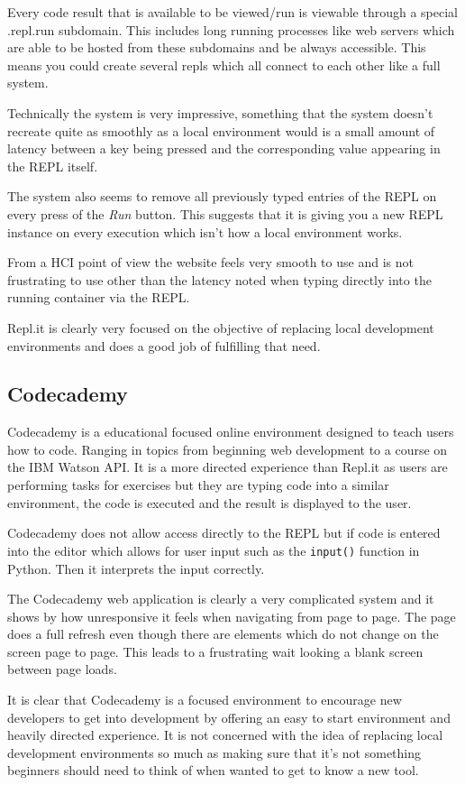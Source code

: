Every code result that is available to be viewed/run is viewable through a special .repl.run subdomain. This includes long running processes like web servers which are able to be hosted from these subdomains and be always accessible. This means you could create several repls which all connect to each other like a full system.

Technically the system is very impressive, something that the system doesn't recreate quite as smoothly as a local environment would is a small amount of latency between a key being pressed and the corresponding value appearing in the REPL itself.

The system also seems to remove all previously typed entries of the REPL on every press of the \textit{Run} button. This suggests that it is giving you a new REPL instance on every execution which isn't how a local environment works.

From a HCI point of view the website feels very smooth to use and is not frustrating to use other than the latency noted when typing directly into the running container via the REPL.

Repl.it is clearly very focused on the objective of replacing local development environments and does a good job of fulfilling that need.

\subsection{Codecademy}
Codecademy is a educational focused online environment designed to teach users how to code. Ranging in topics from beginning web development to a course on the IBM Watson API. It is a more directed experience than Repl.it as users are performing tasks for exercises but they are typing code into a similar environment, the code is executed and the result is displayed to the user.

Codecademy does not allow access directly to the REPL but if code is entered into the editor which allows for user input such as the \texttt{input()} function in Python. Then it interprets the input correctly.

The Codecademy web application is clearly a very complicated system and it shows by how unresponsive it feels when navigating from page to page. The page does a full refresh even though there are elements which do not change on the screen page to page. This leads to a frustrating wait looking a blank screen between page loads.

It is clear that Codecademy is a focused environment to encourage new developers to get into development by offering an easy to start environment and heavily directed experience. It is not concerned with the idea of replacing local development environments so much as making sure that it's not something beginners should need to think of when wanted to get to know a new tool.

